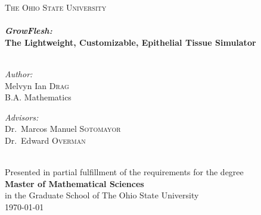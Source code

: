 \begin{titlepage}
\begin{center}

\textsc{\LARGE The Ohio State University}\\[1.5cm]

\HRule \\[0.4cm]
{ \huge \bfseries \emph{GrowFlesh:} \\[0.2cm] \small The Lightweight, Customizable, Epithelial Tissue Simulator \\[0.4cm] }
\HRuleBig \\[1.5cm]

\noindent
\begin{minipage}{0.4\textwidth}
\begin{flushleft} \large
\emph{Author:}\\
Melvyn Ian \textsc{Drag}\\
B.A. Mathematics
\end{flushleft}
\end{minipage}%
\begin{minipage}{0.4\textwidth}
\begin{flushright} \large
\emph{Advisors:} \\
Dr.~Marcos Manuel \textsc{Sotomayor}\\
Dr.~Edward \textsc{Overman}
\end{flushright}
\end{minipage}
\\[4cm]
\vspace{4cm}
Presented in partial fulfillment of the requirements for the degree\\
{\bf{Master of Mathematical Sciences}}\\ in the Graduate School of The Ohio State University \\[1cm]
{\large \today}

\end{center}
\end{titlepage}
